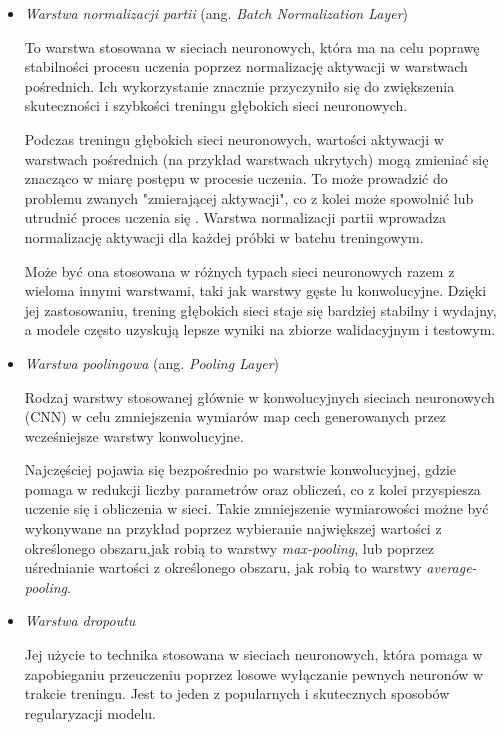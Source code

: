 \begin{itemize}
  \item \emph{Warstwa normalizacji partii} (ang. \emph{Batch Normalization Layer})

        To warstwa stosowana w sieciach neuronowych, która ma na celu poprawę stabilności procesu uczenia poprzez normalizację aktywacji w warstwach pośrednich.
        Ich wykorzystanie znacznie przyczyniło się do zwiększenia skuteczności i szybkości treningu głębokich sieci neuronowych.

        Podczas treningu głębokich sieci neuronowych, wartości aktywacji w warstwach pośrednich (na przykład warstwach ukrytych) mogą zmieniać się znacząco w miarę postępu w procesie uczenia.
        To może prowadzić do problemu zwanych "zmierającej aktywacji", co z kolei może spowolnić lub utrudnić proces uczenia się \cite{bjorck2018understanding}.
        Warstwa normalizacji partii wprowadza normalizację aktywacji dla każdej próbki w batchu treningowym.

        Może być ona stosowana w różnych typach sieci neuronowych razem z wieloma innymi warstwami, taki jak warstwy gęste lu konwolucyjne.
        Dzięki jej zastosowaniu, trening głębokich sieci staje się bardziej stabilny i wydajny, a modele często uzyskują lepsze wyniki na zbiorze walidacyjnym i testowym.

  \item \emph{Warstwa poolingowa} (ang. \emph{Pooling Layer})

        Rodzaj warstwy stosowanej głównie w konwolucyjnych sieciach neuronowych (CNN) w celu zmniejszenia wymiarów map cech generowanych przez wcześniejsze warstwy konwolucyjne.

        Najczęściej pojawia się bezpośrednio po warstwie konwolucyjnej, gdzie pomaga w redukcji liczby parametrów oraz obliczeń, co z kolei przyspiesza uczenie się i obliczenia w sieci.
        Takie zmniejszenie wymiarowości możne być wykonywane na przykład poprzez wybieranie największej wartości z określonego obszaru,jak robią to warstwy \emph{max-pooling}, lub poprzez uśrednianie wartości z określonego obszaru, jak robią to warstwy \emph{average-pooling}.

  \item \emph{Warstwa dropoutu}

        Jej użycie to technika stosowana w sieciach neuronowych, która pomaga w zapobieganiu przeuczeniu poprzez losowe wyłączanie pewnych neuronów w trakcie treningu.
        Jest to jeden z popularnych i skutecznych sposobów regularyzacji modelu.


\end{itemize}
